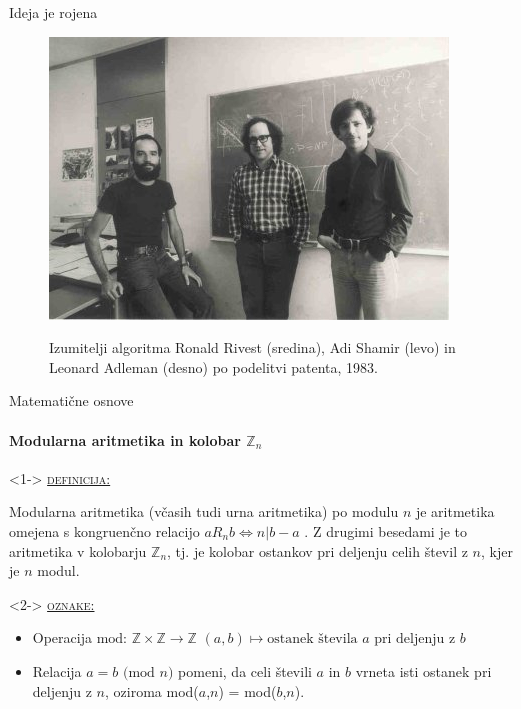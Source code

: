 \documentclass[a4paper, 12pt]{beamer} %
\newcommand{\Zn}{\mathbb{Z}_n}
\newenvironment{matematika}[1]{
\textcolor{bostonuniversityred}{\underline{\textsc{#1:}}}
}{
}
\begin{document}
\begin{frame}{Ideja je rojena}
\begin{figure}
\centering
\includegraphics[scale=1.2]{rsa_inventors}
\label{fig:inventors}
\caption{Izumitelji algoritma Ronald \alert{R}ivest (sredina), Adi \alert{S}hamir (levo) in Leonard \alert{A}dleman (desno) po podelitvi patenta, 1983.}
\end{figure}
\end{frame}

\begin{frame}{Matematične osnove}
\framesubtitle{Modularna aritmetika in kolobar $\Zn$}
\begin{block}<1->{}
\begin{matematika}{definicija}
Modularna aritmetika (včasih tudi urna aritmetika) po modulu $n$ je aritmetika omejena s kongruenčno relacijo $a R_n b \iff n | b - a$ .
\newline
\newline
Z drugimi besedami je to aritmetika v kolobarju $\Zn$, tj. je kolobar ostankov pri deljenju celih števil z $n$, kjer je $n$ modul.
\end{matematika}
\end{block}

\begin{block}<2->{}
\begin{matematika}{oznake}
\newline
\begin{itemize}[label=]
\item Operacija $\text{mod: } \mathbb{Z} \times \mathbb{Z} \to \mathbb{Z}$ $(a, b) \mapsto \text{ostanek števila } a \text{ pri deljenju z } b$
\item Relacija $a = b \text{ (mod } n)$ pomeni, da celi števili $a$ in $b$ vrneta isti ostanek pri deljenju z $n$, oziroma mod($a$,$n$) = mod($b$,$n$).
\end{itemize}
\end{matematika}
\end{block}
\end{frame}
\end{document}
